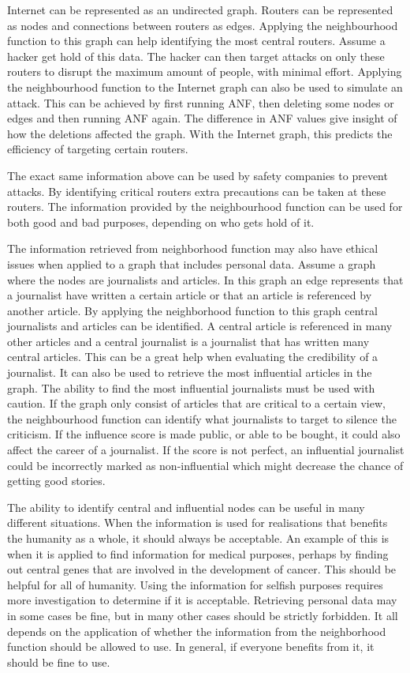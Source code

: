Internet can be represented as an undirected graph. Routers can be represented as nodes and connections between routers as edges. Applying the neighbourhood function to this graph can help identifying the most central routers. Assume a hacker get hold of this data. The hacker can then target attacks on only these routers to disrupt the maximum amount of people, with minimal effort. Applying the neighbourhood function to the Internet graph can also be used to simulate an attack. This can be achieved by first running ANF, then deleting some nodes or edges and then running ANF again. The difference in ANF values give insight of how the deletions affected the graph. With the Internet graph, this predicts the efficiency of targeting certain routers. 

The exact same information above can be used by safety companies to prevent attacks. By identifying critical routers extra precautions can be taken at these routers. The information provided by the neighbourhood function can be used for both good and bad purposes, depending on who gets hold of it.

The information retrieved from neighborhood function may also have ethical issues when applied to a graph that includes personal data. Assume a graph where the nodes are journalists and articles. In this graph an edge represents that a journalist have written a certain article or that an article is referenced by another article. By applying the neighborhood function to this graph central journalists and articles can be identified. A central article is referenced in many other articles and a central journalist is a journalist that has written many central articles. This can be a great help when evaluating the credibility of a journalist. It can also be used to retrieve the most influential articles in the graph. The ability to find the most influential journalists must be used with caution. If the graph only consist of articles that are critical to a certain view, the neighbourhood function can identify what journalists to target to silence the criticism. If the influence score is made public, or able to be bought, it could also affect the career of a journalist. If the score is not perfect, an influential journalist could be incorrectly marked as non-influential which might decrease the chance of getting good stories.

The ability to identify central and influential nodes can be useful in many different situations. When the information is used for realisations that benefits the humanity as a whole, it should always be acceptable. An example of this is when it is applied to find information for medical purposes, perhaps by finding out central genes that are involved in the development of cancer. This should be helpful for all of humanity. Using the information for selfish purposes requires more investigation to determine if it is acceptable. Retrieving personal data may in some cases be fine, but in many other cases should be strictly forbidden. It all depends on the application of whether the information from the neighborhood function should be allowed to use. In general, if everyone benefits from it, it should be fine to use.
 
